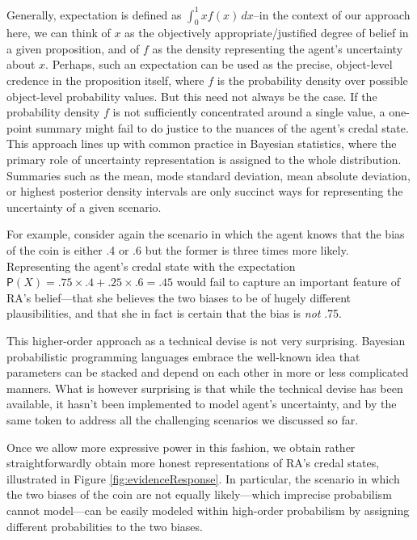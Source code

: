 \documentclass[
  10pt,
  dvipsnames,enabledeprecatedfontcommands]{scrartcl}
\begin{document}
Generally, expectation is defined as \(\int_{0}^{1} x f(x) \, dx\)--in
the context of our approach here, we can think of \(x\) as the
objectively appropriate/justified degree of belief in a given
proposition, and of \(f\) as the density representing the agent's
uncertainty about \(x\). Perhaps, such an expectation can be used as the
precise, object-level credence in the proposition itself, where \(f\) is
the probability density over possible object-level probability values.
But this need not always be the case. If the probability density \(f\)
is not sufficiently concentrated around a single value, a one-point
summary might fail to do justice to the nuances of the agent's credal
state. This approach lines up with common practice in Bayesian
statistics, where the primary role of uncertainty representation is
assigned to the whole distribution. Summaries such as the mean, mode
standard deviation, mean absolute deviation, or highest posterior
density intervals are only succinct ways for representing the
uncertainty of a given scenario.

For example, consider again the scenario in which the agent knows that
the bias of the coin is either .4 or .6 but the former is three times
more likely. Representing the agent's credal state with the expectation
\(\mathsf{P}(X) = .75 \times .4 + .25 \times .6 = .45\) would fail to
capture an important feature of RA's belief---that she believes the two
biases to be of hugely different plausibilities, and that she in fact is
certain that the bias is \emph{not} .75.

This higher-order approach as a technical devise is not very surprising.
Bayesian probabilistic programming languages embrace the well-known idea
that parameters can be stacked and depend on each other in more or less
complicated manners. What is however
surprising is that while the technical devise has been available, it
hasn't been implemented to model agent's uncertainty, and by the same
token to address all the challenging scenarios we discussed so far.

Once we allow more expressive power in this fashion, we obtain rather
straightforwardly obtain more honest representations of RA's credal
states, illustrated in Figure \ref{fig:evidenceResponse}. In particular,
the scenario in which the two biases of the coin are not equally
likely---which imprecise probabilism cannot model---can be easily
modeled within high-order probabilism by assigning different
probabilities to the two biases.
\end{document}
